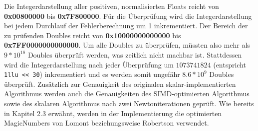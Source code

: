 \documentclass[course=erap]{aspdoc}
\begin{document}
Die Integerdarstellung aller positiven, normalisierten Floats reicht von \textbf{0x00800000} bis \textbf{0x7F800000}. Für die Überprüfung wird die Integerdarstellung bei jedem Durchlauf der Fehlerberechnung um 1 inkrementiert. Der Bereich der zu prüfenden Doubles reicht von \textbf{0x10000000000000} bis \textbf{0x7FF0000000000000}. Um alle Doubles zu überprüfen, müssten also mehr als $9*10^{18}$ Doubles überprüft werden, was zeitlich nicht machbar ist. Stattdessen wird die Integerdarstellung nach jeder Überprüfung um $1073741824$ (entspricht \lstinline{1llu << 30}) inkrementiert und es werden somit ungefähr $8.6*10^9$ Doubles überprüft. Zusätzlich zur Genauigkeit des originalen skalar-implementierten Algorithmus werden auch die Genauigkeiten des SIMD-optimierten Algorithmus sowie des skalaren Algorithmus nach zwei Newtoniterationen geprüft. Wie bereits in Kapitel 2.3 erwähnt, werden in der Implementierung die optimierten MagicNumbers von Lomont beziehungsweise Robertson verwendet. 
\end{document}
